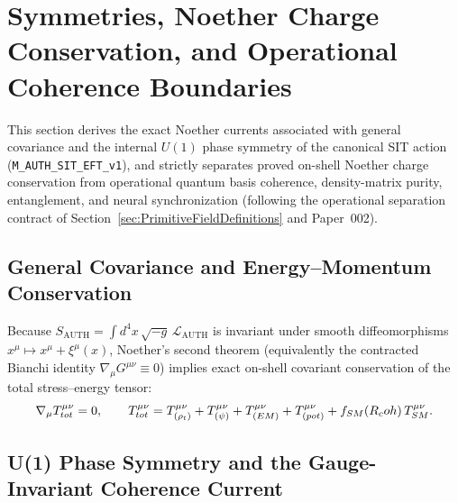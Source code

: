 \section{Symmetries, Noether Charge Conservation, and Operational Coherence Boundaries}
\label{sec:coherence-conservation}
\label{sec:symmetry-noether-moved}
\label{app:NoetherCurrents}

This section derives the exact Noether currents associated with general covariance and the internal $U(1)$ phase symmetry of the canonical SIT action (\texttt{M\_AUTH\_SIT\_EFT\_v1}), and strictly separates proved on-shell Noether charge conservation from operational quantum basis coherence, density-matrix purity, entanglement, and neural synchronization (following the operational separation contract of Section~\ref{sec:PrimitiveFieldDefinitions} and Paper~002).

\subsection{General Covariance and Energy--Momentum Conservation}

Because $S_{\mathrm{AUTH}} = \int d^4x\,\sqrt{-g}\,\mathcal{L}_{\mathrm{AUTH}}$ is invariant under smooth diffeomorphisms $x^\mu \mapsto x^\mu + \xi^\mu(x)$, Noether's second theorem (equivalently the contracted Bianchi identity $\nabla_\mu G^{\mu\nu} \equiv 0$) implies exact on-shell covariant conservation of the total stress--energy tensor:
\[
\nabla_\mu T^{\mu\nu}_{tot} = 0,
\qquad
T^{\mu\nu}_{tot} = T^{\mu\nu}_{(\rho_t)} + T^{\mu\nu}_{(\psi)} + T^{\mu\nu}_{(EM)} + T^{\mu\nu}_{(pot)} + f_{SM}(R_coh)\,T^{\mu\nu}_{SM}.
\]

\subsection{U(1) Phase Symmetry and the Gauge-Invariant Coherence Current}

